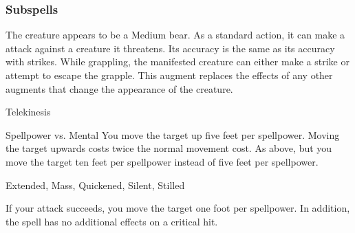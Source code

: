 \subsubsection{Subspells}
The creature appears to be a Medium bear.
As a standard action, it can make a  attack against a creature it threatens.
Its accuracy is the same as its accuracy with strikes.
While grappling, the manifested creature can either make a strike or attempt to escape the grapple.
This augment replaces the effects of any other augments that change the appearance of the creature.
\begin{spellsection}{Telekinesis}
\begin{spellcontent}
\begin{spelltargetinginfo}
\end{spelltargetinginfo}
\begin{spelleffects}
\begin{spellattack}{Spellpower vs. Mental}
\spellsuccess
You move the target up five feet per spellpower. Moving the target upwards costs twice the normal movement cost.
\spellcritical
As above, but you move the target ten feet per spellpower instead of five feet per spellpower.
\end{spellattack}
\end{spelleffects}
\end{spellcontent}
\begin{spellfooter}
 Extended, Mass, Quickened, Silent, Stilled
\end{spellfooter}
\begin{spellsubcontent}
\begin{spellcantrip}
If your attack succeeds, you move the target one foot per spellpower. In addition, the spell has no additional effects on a critical hit.
\end{spellcantrip}
\end{spellsubcontent}
\end{spellsection}
